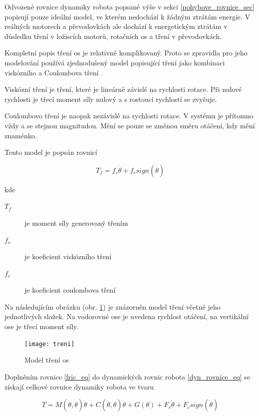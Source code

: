 Odvozené rovnice dynamiky robota popsané výše v sekci \ref{pohybove_rovnice_sec} popisují pouze ideální model, ve kterém nedochází k žádným ztrátám energie. V reálných motorech a převodovkách ale dochází k energetickým ztrátám v důsledku tření v ložiscích motorů, rotačních os a tření v převodovkách.

Kompletní popis tření os je relativně komplikovaný. Proto se zpravidla pro jeho modelování používá zjednodušený model popisující tření jako kombinaci viskózního a Coulombova tření \cite{}. 

Viskózní tření je tření, které je lineárně závislé na rychlosti rotace. Při nulové rychlosti je třecí moment síly nulový a s rostoucí rychlostí se zvyšuje.

Coulombovo tření je naopak nezávislé na rychlosti rotace. V systému je přítomno vždy a se stejnou magnitudou. Mění se pouze se změnou směru otáčení, kdy mění znaménko.

Tento model je popsán rovnicí 

\begin{equation}
T_f = f_v\dot{\theta} + f_csign(\dot{\theta})
\label{fric_eq}
\end{equation}

kde

\begin{description}
\item[$T_f$] je moment síly generovaný třením 
\item[$f_v$] je koeficient viskózního tření 
\item[$f_c$] je koeficient coulombova tření 
\end{description}

Na následujícím obrázku (obr. \ref{treni_pic}) je znázorněn model tření včetně jeho jednotlivých složek. Na vodorovné ose je uvedena rychlost otáčení, na vertikální ose je třecí moment síly.

\begin{figure}[ht]
\texttt{[image: treni]}
\caption{Model tření os}
\label{treni_pic}
\end{figure}

Doplněním rovnice \ref{fric_eq} do dynamických rovnic robota \ref{dyn_rovnice_eq} se získají celkové rovnice dynamiky robota ve tvaru

\begin{equation}
T = M(\dot{\theta},\theta)\ddot{\theta} + C(\dot{\theta},\theta)\dot{\theta} + G(\theta) + F_v\dot{\theta} + F_csign(\dot{\theta})
\label{celkova_dyn_rovnice_eq}
\end{equation}

